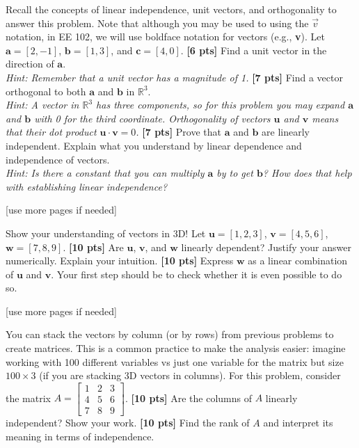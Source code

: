 \documentclass{ee102_pset}
\author{\rule{3cm}{0.4pt}} %
\begin{document}
 Recall the concepts of linear independence, unit vectors, and orthogonality to answer this problem. Note that although you may be used to using the $\vec{v}$ notation, in EE 102, we will use boldface notation for vectors (e.g., \textbf{v}).
Let $\textbf{a} = [2, -1]$, $\textbf{b} = [1, 3]$, and $\textbf{c} = [4, 0]$.
\problempart \textbf{[6 pts]} Find a unit vector in the direction of $\textbf{a}$. \\ 
\textit{Hint: Remember that a unit vector has a magnitude of 1.}
\problempart \textbf{[7 pts]} Find a vector orthogonal to both $\textbf{a}$ and $\textbf{b}$ in $\mathbb{R}^3$. \\ \textit{Hint: A vector in $\mathbb{R}^3$ has three components, so for this problem you may expand $\textbf{a}$ and $\textbf{b}$ with 0 for the third coordinate. Orthogonality of vectors $\textbf{u}$ and $\textbf{v}$ means that their dot product $\textbf{u} \cdot \textbf{v} = 0$.}
\problempart \textbf{[7 pts]} Prove that $\textbf{a}$ and $\textbf{b}$ are linearly independent. Explain what you understand by linear dependence and independence of vectors.\\ \textit{Hint: Is there a constant that you can multiply $\textbf{a}$ by to get $\textbf{b}$? How does that help with establishing linear independence?}
\vspace*{\fill}
\begin{center}
[use more pages if needed]
\end{center}




 Show your understanding of vectors in 3D! 
Let $\textbf{u} = [1, 2, 3]$, $\textbf{v} = [4, 5, 6]$, $\textbf{w} = [7, 8, 9]$.
\problempart \textbf{[10 pts]} Are $\textbf{u}$, $\textbf{v}$, and $\textbf{w}$ linearly dependent? Justify your answer numerically. Explain your intuition.
\problempart \textbf{[10 pts]} Express $\textbf{w}$ as a linear combination of $\textbf{u}$ and $\textbf{v}$. Your first step should be to check whether it is even possible to do so.



\vspace*{\fill}
\begin{center}
[use more pages if needed]
\end{center}

 You can stack the vectors by column (or by rows) from previous problems to create matrices. This is a common practice to make the analysis easier: imagine working with 100 different variables vs just one variable for the matrix but size $100 \times 3$ (if you are stacking 3D vectors in columns).
For this problem, consider the matrix $A = \begin{bmatrix} 1 & 2 & 3 \\ 4 & 5 & 6 \\ 7 & 8 & 9 \end{bmatrix}$.
\problempart \textbf{[10 pts]} Are the columns of $A$ linearly independent? Show your work.
\problempart \textbf{[10 pts]} Find the rank of $A$ and interpret its meaning in terms of independence.
\end{document}
